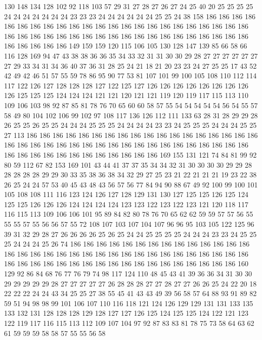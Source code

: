 130 148 134 128 102 92 118 103 57 29 31 27 28 27 26 27 24 25 40 20
25 25 25 25 24 24 24 24 24 24 24 23 23 23 24 24 24 24 24 24
25 25 24 38 158 186 186 186 186 186 186 186 186 186 186 186 186 186 186 186
186 186 186 186 186 186 186 186 186 186 186 186 186 186 186 186 186 186 186 186
186 186 186 186 186 186 186 186 186 186 186 186 149 159 159 120 115 106 105 130
128 147 139 85 66 58 66 116 128 169 94 47 43 38 38 36 36 35 34 33
32 31 31 30 30 29 28 27 27 27 27 27 27 27 29 33 34 31 34 36
40 37 36 31 28 25 24 21 18 21 20 23 23 24 27 25 25 17 43 52
42 49 42 46 51 57 55 59 78 86 95 90 77 53 81 107 101 99 100 105
108 110 112 114 117 122 126 127 128 128 128 127 122 125 127 126 126 126 126 126
126 126 126 126 125 125 125 124 124 124 121 121 120 121 121 119 120 119 117 115
113 110 109 106 103 98 92 87 85 81 78 76 70 65 60 60 58 57 55 54
54 54 54 54 56 54 55 57 58 49 80 104 102 106 99 102 97 108 117 136
126 112 111 133 63 28 31 28 29 29 28 26 25 25 26 25 25 24 24 24
25 25 25 24 24 24 24 23 23 24 25 25 25 24 24 24 25 25 27 113
186 186 186 186 186 186 186 186 186 186 186 186 186 186 186 186 186 186 186 186
186 186 186 186 186 186 186 186 186 186 186 186 186 186 186 186 186 186 186 186
186 186 186 186 186 186 186 186 186 169 155 131 121 74 84 81 99 92 80 59
112 67 82 153 169 101 43 44 41 37 37 35 34 34 32 31 30 30 30 30
29 29 28 28 28 28 28 29 29 30 33 35 38 36 38 34 32 29 27 25
23 21 22 21 21 21 19 23 22 38 26 25 24 24 57 53 40 45 43 48
43 56 57 56 77 84 94 90 88 67 49 92 100 99 100 101 105 108 108 111
116 123 124 126 127 128 129 131 130 127 125 125 126 125 124 125 125 126 126 126
124 124 124 124 123 123 122 123 122 123 121 120 118 117 116 115 113 109 106 106
101 95 89 84 82 80 78 76 70 65 62 62 59 59 57 57 56 55 55 55
57 55 56 56 57 55 72 108 107 103 107 104 107 96 96 95 103 105 122 125
96 39 31 32 29 28 27 26 26 26 26 25 26 25 24 24 25 25 25 25
24 24 24 23 23 24 25 25 25 24 24 24 25 26 74 186 186 186 186 186
186 186 186 186 186 186 186 186 186 186 186 186 186 186 186 186 186 186 186 186
186 186 186 186 186 186 186 186 186 186 186 186 186 186 186 186 186 186 186 186
186 186 186 186 186 186 160 129 92 86 84 68 76 77 76 79 74 98 117 124
110 48 45 43 41 39 36 36 34 31 30 30 29 29 29 29 29 28 27 27
27 27 27 26 28 28 28 27 27 28 27 27 26 26 25 24 22 20 18 22
22 22 24 24 43 34 25 25 27 38 55 45 41 43 43 49 39 56 58 57
64 88 93 91 89 82 59 51 94 98 98 99 101 106 107 110 116 118 121 124
126 129 129 131 131 133 135 133 132 131 128 128 128 129 128 127 127 126 125 124
125 125 124 122 121 123 122 119 117 116 115 113 112 109 107 104 97 92 87 83
83 81 78 75 73 58 64 63 62 61 59 59 59 58 58 57 55 55 56 58
